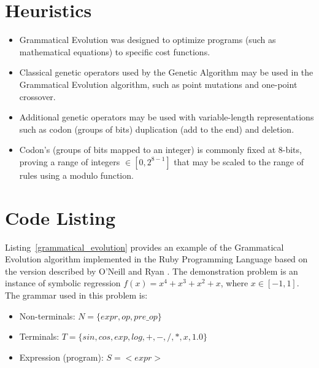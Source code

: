 \documentclass[a4paper, 11pt]{article}
\begin{document}
\section{Heuristics}
\label{sec:heuristics}
\begin{itemize}
	\item Grammatical Evolution was designed to optimize programs (such as mathematical equations) to specific cost functions.
	\item Classical genetic operators used by the Genetic Algorithm may be used in the Grammatical Evolution algorithm, such as point mutations and one-point crossover.
	\item Additional genetic operators may be used with variable-length representations such as codon (groups of bits) duplication (add to the end) and deletion.
	\item Codon's (groups of bits mapped to an integer) is commonly fixed at 8-bits, proving a range of integers $\in [0,2^{8-1}]$ that may be scaled to the range of rules using a modulo function.
\end{itemize}

\section{Code Listing}
\label{sec:code}
Listing~\ref{grammatical_evolution} provides an example of the Grammatical Evolution algorithm implemented in the Ruby Programming Language based on the version described by O'Neill and Ryan \cite{O'Neill2001}.
The demonstration problem is an instance of symbolic regression $f(x)=x^4+x^3+x^2+x$, where $x\in[-1,1]$. 
The grammar used in this problem is: 
\begin{itemize}
	\item Non-terminals: $N=\{expr,op,pre\_op\}$
	\item Terminals: $T=\{sin,cos,exp,log,+,-,/,*,x,1.0\}$
	\item Expression (program): $S=<expr>$
\end{itemize}
\end{document}
